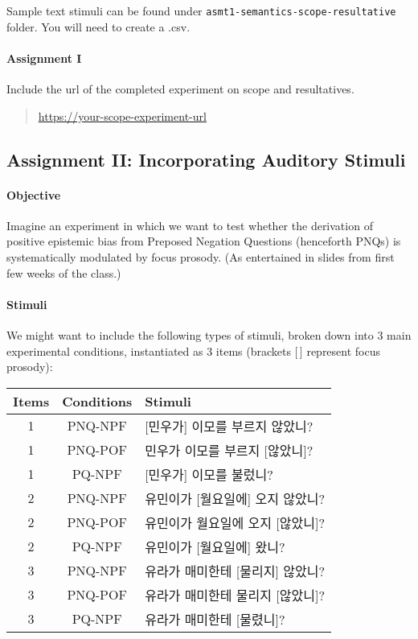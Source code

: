 \documentclass{article}
\begin{document}
\noindent Sample text stimuli can be found under \texttt{asmt1-semantics-scope-resultative} folder. You will need to create a .csv.

\paragraph{Assignment I}

Include the url of the completed experiment on scope and resultatives.\ 

\begin{quotation}
\noindent
\url{https://your-scope-experiment-url}
\end{quotation}




\subsection{Assignment II: Incorporating Auditory Stimuli}\label{asmt2}

\paragraph{Objective} Imagine an experiment in which we want to test whether the derivation of positive epistemic bias from Preposed Negation Questions (henceforth PNQs) is systematically modulated by focus prosody. (As entertained in slides from first few weeks of the class.)

\paragraph{Stimuli} We might want to include the following types of stimuli, broken down into 3 main experimental conditions, instantiated as 3 items (brackets [\,] represent focus prosody):

\begin{table}[h]
    \centering
    \begin{tabular}[b]{c c l}
        \toprule
        Items & Conditions & Stimuli \\
        \midrule
        1 & PNQ-NPF & [민우가] 이모를 부르지 않았니? \\
        1 & PNQ-POF & 민우가 이모를 부르지 [않았니]? \\
        1 & PQ-NPF & [민우가] 이모를 불렀니? \\
        \midrule
        2 & PNQ-NPF & 유민이가 [월요일에] 오지 않았니? \\
        2 & PNQ-POF & 유민이가 월요일에 오지 [않았니]? \\
        2 & PQ-NPF & 유민이가 [월요일에] 왔니? \\
        \midrule
        3 & PNQ-NPF & 유라가 매미한테 [물리지] 않았니? \\
        3 & PNQ-POF & 유라가 매미한테 물리지 [않았니]? \\
        3 & PQ-NPF & 유라가 매미한테 [물렸니]? \\
        \bottomrule
    \end{tabular}
\end{table}
\end{document}
